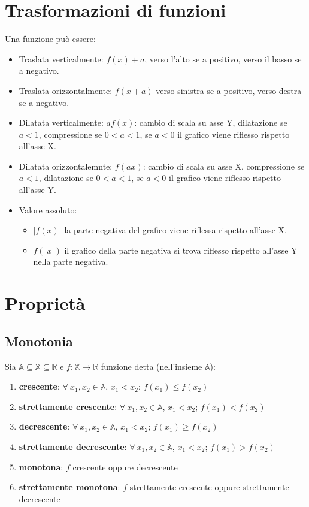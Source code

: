 \section{Trasformazioni di funzioni}
Una funzione pu\`o essere:
\begin{itemize}
\item Traslata verticalmente: $f(x)+a$, verso l'alto se a positivo, verso il basso se a negativo.
\item Traslata orizzontalmente: $f(x+a)$ verso sinistra se a positivo, verso destra se a negativo.
\item Dilatata verticalmente: $af(x)$: cambio di scala su asse Y, dilatazione se $a<1$, compressione se $0<a<1$, se $a<0$ il grafico viene riflesso rispetto all'asse X.
\item Dilatata orizzontalemnte: $f(ax)$: cambio di scala su asse X, compressione se $a<1$, dilatazione se $0<a<1$, se $a<0$ il grafico viene riflesso rispetto all'asse Y.
\item Valore assoluto:
\begin{itemize}
\item $|f(x)|$ la parte negativa del grafico viene riflessa rispetto all'asse X.
\item $f(|x|)$ il grafico della parte negativa si trova riflesso rispetto all'asse Y nella parte negativa.
\end{itemize}
\end{itemize}
\section{Proprietà}
\subsection{Monotonia}
Sia $\mathbb{A} \subseteq \mathbb{X} \subseteq \mathbb{R}$ e $f: \mathbb{X} \rightarrow \mathbb{R}$ funzione detta (nell'insieme $\mathbb{A}$):
\begin{enumerate}
\item \textbf{crescente}: $\forall\ x_1,x_2 \in \mathbb{A}$, $x_1<x_2$; $f(x_1) \leq f(x_2)$
\item \textbf{strettamente crescente}: $\forall\ x_1,x_2 \in \mathbb{A}$, $x_1<x_2$; $f(x_1) < f(x_2)$
\item \textbf{decrescente}: $\forall\ x_1,x_2 \in \mathbb{A}$, $x_1<x_2$; $f(x_1) \geq f(x_2)$
\item \textbf{strettamente decrescente}: $\forall\ x_1,x_2 \in \mathbb{A}$, $x_1<x_2$; $f(x_1) > f(x_2)$
\item \textbf{monotona}: $f$ crescente oppure decrescente
\item \textbf{strettamente monotona}: $f$ strettamente crescente oppure strettamente decrescente
\end{enumerate}
